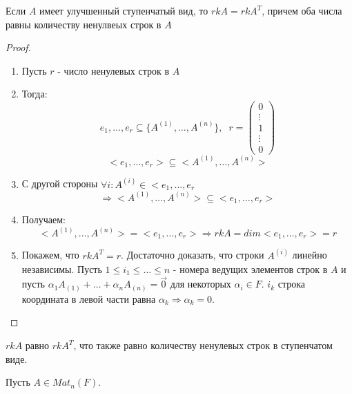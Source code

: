 \begin{lemma}[$rk A = rk A^T$]

    Если $A$ имеет улучшенный ступенчатый вид, то $rk A = rk A^T$, причем оба числа равны количеству ненулвеых строк в $A$

    \begin{proof}
        
        \begin{enumerate}
            \item Пусть $r$ - число ненулевых строк в $A$
            \item Тогда:
            $$e_1, \dots, e_r \subseteq \{A^{(1)}, \dots, A^{(n)}\}, \;\; r = \begin{pmatrix}
                0 \\ \vdots \\ 1 \\ \vdots \\ 0
            \end{pmatrix}$$
            $$<e_1, \dots, e_r> \subseteq <A^{(1)}, \dots, A^{(n)}>$$
            \item С другой стороны $\forall i: A^{(i)} \in <e_1, \dots, e_r$
            $$\Rightarrow <A^{(1)}, \dots, A^{(n)}> \subseteq <e_1, \dots, e_r>$$
            \item Получаем:
            $$<A^{(1)}, \dots, A^{(n)}> = <e_1, \dots, e_r> \Rightarrow rk A = dim<e_1, \dots, e_r> = r$$
            \item Покажем, что $rk A^T = r$. Достаточно доказать, что строки $A^{(i)}$ линейно независимы. Пусть $1 \leq i_1 \leq \dots \leq n$ - номера ведущих элементов строк в $A$ и пусть $\alpha_1 A_{(1)} + \dots + \alpha_n A_{(n)} = \vec{0}$ для некоторых $\alpha_i \in F$. $i_k$ строка координата в левой части равна $\alpha_k \Rightarrow \alpha_k = 0$.
        \end{enumerate}

    \end{proof}
    
\end{lemma}


\begin{lemma}
    
    $rk A$ равно $rk A^T$, что также равно количеству ненулевых строк в ступенчатом виде.

\end{lemma}


Пусть $A \in Mat_{n}(F)$.


